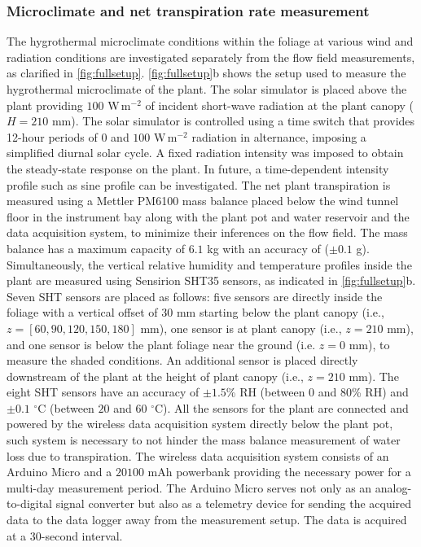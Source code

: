 \subsubsection*{Microclimate and net transpiration rate measurement}
The hygrothermal microclimate conditions within the foliage at various wind and radiation conditions are investigated separately from the flow field measurements, as clarified in \cref{fig:fullsetup}. \cref{fig:fullsetup}b shows the setup used to measure the hygrothermal microclimate of the plant. The solar simulator is placed above the plant providing $100$ W\,m$^{-2}$ of incident short-wave radiation at the plant canopy ($H=210$ mm). The solar simulator is controlled using a time switch that provides 12-hour periods of $0$ and $100$ W\,m$^{-2}$ radiation in alternance, imposing a simplified diurnal solar cycle. A fixed radiation intensity was imposed to obtain the steady-state response on the plant. In future, a time-dependent intensity profile such as sine profile can be investigated. The net plant transpiration is measured using a Mettler PM6100 mass balance placed below the wind tunnel floor in the instrument bay along with the plant pot and water reservoir and the data acquisition system, to minimize their inferences on the flow field. The mass balance has a maximum capacity of $6.1$ kg with an accuracy of ($\pm 0.1$ g). Simultaneously, the vertical relative humidity and temperature profiles inside the plant are measured using Sensirion SHT35 sensors, as indicated in \cref{fig:fullsetup}b. Seven SHT sensors are placed as follows: five sensors are directly inside the foliage with a vertical offset of $30$ mm starting below the plant canopy (i.e., $z=[60,90,120,150,180]$ mm), one sensor is at plant canopy (i.e., $z=210$ mm), and one sensor is below the plant foliage near the ground (i.e. $z=0$ mm), to measure the shaded conditions. An additional sensor is placed directly downstream of the plant at the height of plant canopy (i.e., $z=210$ mm). The eight SHT sensors have an accuracy of $\pm1.5$\% RH (between $0$ and $80$\% RH) and $\pm0.1$ $^{\circ}$C (between $20$ and $60$ $^{\circ}$C). All the sensors for the plant are connected and powered by the wireless data acquisition system directly below the plant pot, such system is necessary to not hinder the mass balance measurement of water loss due to transpiration. The wireless data acquisition system consists of an Arduino Micro and a $\num{20100}$ mAh powerbank providing the necessary power for a multi-day measurement period. The Arduino Micro serves not only as an analog-to-digital signal converter but also as a telemetry device for sending the acquired data to the data logger away from the measurement setup. The data is acquired at a 30-second interval. 


